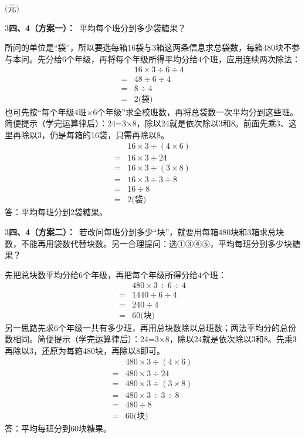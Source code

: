 \documentclass[multi=snippet,border={5bp 20bp 5bp 5bp}]{standalone}
\newenvironment{snippet}[3]{\begin{minipage}{#1bp}\color{answerred}\fontsize{#2}{#3}\selectfont\raggedright}{\end{minipage}}
\begin{document}
\begin{snippet}{80}{10.0}{14}\SourceSans\setlength{\mathindent}{2bp}\(\text{(元)}\)\end{snippet}
\begin{snippet}{505}{11.5}{14}\begin{multicols}{3}\raggedcolumns \textbf{四、4（方案一）：}\ 平均每个班分到多少袋糖果？\par 所问的单位是“袋”，所以要选每箱\(16\)\allowbreak 袋与\(3\)\allowbreak 箱这两条信息求总袋数，每箱\(480\)\allowbreak 块不参与本问。先分给\(6\)\allowbreak 个年级，再将每个年级所得平均分给\(4\)\allowbreak 个班，应用连续两次除法：\[\begin{aligned}&16\times3\div6\div4\\={}&48\div6\div4\\={}&8\div4\\={}&2\text{(袋)}\end{aligned}\]也可先按“每个年级\(4\)\allowbreak 班\(\times6\)\allowbreak 个年级”求全校班数，再将总袋数一次平均分到这些班。简便提示（学完运算律后）：24=3×8，除以24就是依次除以3和8。前面先乘3、这里再除以3，仍是每箱的16袋，只需再除以8。\[\begin{aligned}&16\times3\div(4\times6)\\={}&16\times3\div24\\={}&16\times3\div(3\times8)\\={}&16\times3\div3\div8\\={}&16\div8\\={}&2\text{(袋)}\end{aligned}\]答：平均每班分到2袋糖果。\end{multicols}\end{snippet}
\begin{snippet}{505}{11.5}{14}\begin{multicols}{3}\raggedcolumns \textbf{四、4（方案二）：}\ 若改问每班分到多少“块”，就要用每箱\(480\)\allowbreak 块和\(3\)\allowbreak 箱求总块数，不能再用袋数代替块数。另一合理提问：选①③④⑤，平均每班分到多少块糖果？\par 先把总块数平均分给\(6\)\allowbreak 个年级，再把每个年级所得分给\(4\)\allowbreak 个班：\[\begin{aligned}&480\times3\div6\div4\\={}&1440\div6\div4\\={}&240\div4\\={}&60\text{(块)}\end{aligned}\]另一思路先求\(6\)\allowbreak 个年级一共有多少班，再用总块数除以总班数；两法平均分的总份数相同。简便提示（学完运算律后）：24=3×8，除以24就是依次除以3和8。先乘3再除以3，还原为每箱480块，再除以8即可。\[\begin{aligned}&480\times3\div(4\times6)\\={}&480\times3\div24\\={}&480\times3\div(3\times8)\\={}&480\times3\div3\div8\\={}&480\div8\\={}&60\text{(块)}\end{aligned}\]答：平均每班分到60块糖果。\end{multicols}\end{snippet}
\end{document}
